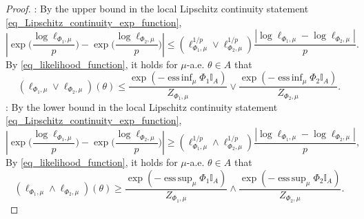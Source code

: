 \documentclass[a4paper]{scrartcl}
\theoremstyle{definition}
\numberwithin{equation}{section}
\DeclareMathOperator*{\essinf}{ess\,inf}
\DeclareMathOperator*{\esssup}{ess\,sup}
\newcommand{\Abs}[1]{\left\vert#1\right\vert}
\begin{document}
\begin{proof}
: 
By the upper bound in the local Lipschitz continuity statement \eqref{eq_Lipschitz_continuity_exp_function}, 
\begin{equation*}
 \Abs{ \exp\biggr(\frac{\log\ell_{\Phi_1,\mu}}{p}\biggr) -  \exp\biggr(\frac{\log\ell_{\Phi_2,\mu}}{p}\biggr) }  \leq \left(\ell_{\Phi_1,\mu}^{1/p}\vee \ell_{\Phi_2,\mu}^{1/p}\right)  \frac{\Abs{\log\ell_{\Phi_1,\mu}-\log\ell_{\Phi_2,\mu}}}{p}.
\end{equation*}
By \eqref{eq_likelihood_function}, it holds for $\mu$-a.e. $\theta\in A$ that
\begin{equation*}
 (\ell_{\Phi_1,\mu}\vee \ell_{\Phi_2,\mu})(\theta)
 \leq \frac{\exp(-\essinf_\mu\Phi_1\mathbb{I}_A)}{Z_{\Phi_1,\mu}}\vee \frac{\exp(-\essinf_\mu\Phi_2\mathbb{I}_A)}{Z_{\Phi_2,\mu}}.
\end{equation*}
: By the lower bound in the local Lipschitz continuity statement  \eqref{eq_Lipschitz_continuity_exp_function},
\begin{equation*}
\Abs{ \exp\biggr(\frac{\log\ell_{\Phi_1,\mu}}{p}\biggr) -  \exp\biggr(\frac{\log\ell_{\Phi_2,\mu}}{p}\biggr) } 
 \geq \left(\ell_{\Phi_1,\mu}^{1/p}\wedge \ell_{\Phi_2,\mu}^{1/p}\right)  \frac{\Abs{\log\ell_{\Phi_1,\mu}-\log\ell_{\Phi_2,\mu}}}{p},
\end{equation*}
By \eqref{eq_likelihood_function}, it holds for $\mu$-a.e. $\theta\in A$ that
\begin{equation*}
 (\ell_{\Phi_1,\mu}\wedge \ell_{\Phi_2,\mu})(\theta)
 \geq 
 \frac{\exp(-\esssup_\mu\Phi_1\mathbb{I}_A)}{Z_{\Phi_1,\mu}}\wedge \frac{\exp(-\esssup_\mu\Phi_2\mathbb{I}_A)}{Z_{\Phi_2,\mu}}.
\end{equation*}
\end{proof}
\end{document}
